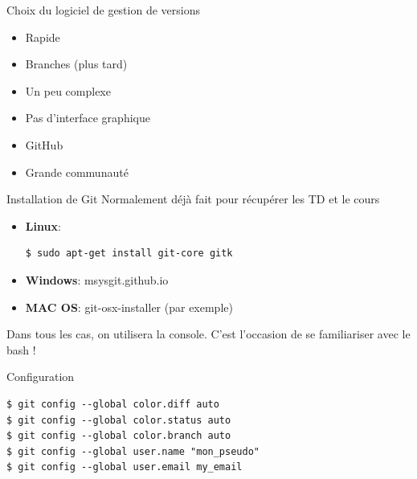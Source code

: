\documentclass[presentation]{beamer}
\newcommand{\valid}{\textcolor{ao}{\Checkmark}}
\newcommand{\unvalid}{\textcolor{bostonuniversityred}{\XSolidBrush}}
\begin{document}
\begin{frame}{Choix du logiciel de gestion de versions}
\begin{multicols}{2}
\begin{figure}%
\end{figure}
\begin{itemize}
\item[\valid] Rapide
\item[\valid] Branches (plus tard)
\item[\unvalid] Un peu complexe
\item[\unvalid] Pas d'interface graphique
\item[\valid \valid] GitHub
\item[\valid \valid] Grande communauté
\end{itemize}
\end{multicols}
\end{frame}

\begin{frame}[fragile]{Installation de Git}
Normalement déjà fait pour récupérer les TD et le cours
\begin{itemize}
	\item \textbf{Linux}:
	\begin{lstlisting}
$ sudo apt-get install git-core gitk 
\end{lstlisting}
	\item \textbf{Windows}: msysgit.github.io
	\item \textbf{MAC OS}: git-osx-installer (par exemple)
\end{itemize}
\pause
\begin{center}
	Dans tous les cas, on utilisera la console. C'est l'occasion de se familiariser avec le bash !
\end{center}
\end{frame}

\begin{frame}[fragile]{Configuration}
\begin{lstlisting}
$ git config --global color.diff auto
$ git config --global color.status auto
$ git config --global color.branch auto
$ git config --global user.name "mon_pseudo"
$ git config --global user.email my_email
\end{lstlisting}
\end{frame}
\end{document}
